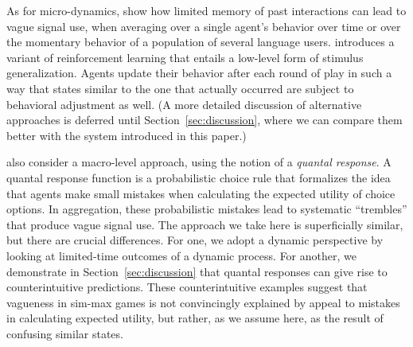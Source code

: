 As for micro-dynamics, \citet{FrankeJager2010:Vagueness-Signa} show
how limited memory of past interactions can lead to vague signal use,
when averaging over a single agent's behavior over time or over the
momentary behavior of a population of several language
users. \citet{OConnor2013:The-Evolution-o} introduces a variant of
reinforcement learning that entails a low-level form of stimulus
generalization. Agents update their behavior after each round of play
in such a way that states similar to the one that actually occurred
are subject to behavioral adjustment as well. (A more detailed
discussion of alternative approaches is deferred until
Section~\ref{sec:discussion}, where we can compare them better with the
system introduced in this paper.)

\citet{FrankeJager2010:Vagueness-Signa} also consider a macro-level
approach, using the notion of a \emph{quantal response}. A quantal
response function is a probabilistic choice rule that formalizes the
idea that agents make small mistakes when calculating the expected
utility of choice options. In aggregation, these probabilistic
mistakes lead to systematic ``trembles'' that produce vague signal
use. The approach we take here is superficially similar, but there are
crucial differences. For one, we adopt a dynamic perspective by
looking at limited-time outcomes of a dynamic process. For another, we
demonstrate in Section~\ref{sec:discussion} that quantal responses can
give rise to counterintuitive predictions. These counterintuitive
examples suggest that vagueness in sim-max games is not convincingly
explained by appeal to mistakes in calculating expected utility, but
rather, as we assume here, as the result of confusing similar
states.







